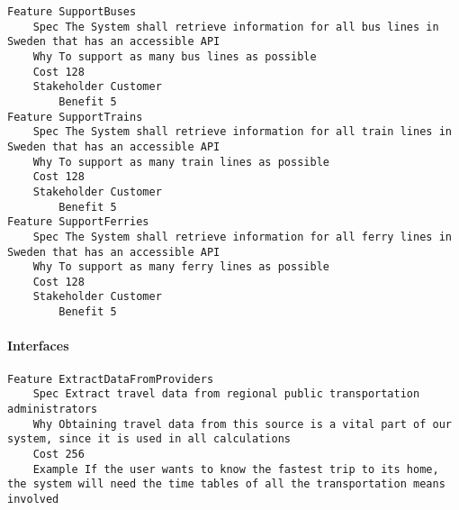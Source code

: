 \begin{lstlisting}
Feature SupportBuses
	Spec The System shall retrieve information for all bus lines in Sweden that has an accessible API
	Why To support as many bus lines as possible
	Cost 128
	Stakeholder Customer
		Benefit 5
Feature SupportTrains
	Spec The System shall retrieve information for all train lines in Sweden that has an accessible API
	Why To support as many train lines as possible
	Cost 128
	Stakeholder Customer
		Benefit 5
Feature SupportFerries
	Spec The System shall retrieve information for all ferry lines in Sweden that has an accessible API
	Why To support as many ferry lines as possible
	Cost 128
	Stakeholder Customer
		Benefit 5

\end{lstlisting}
		
				
			 \paragraph{Interfaces}


\begin{lstlisting}
Feature ExtractDataFromProviders
	Spec Extract travel data from regional public transportation administrators
	Why Obtaining travel data from this source is a vital part of our system, since it is used in all calculations
	Cost 256
	Example If the user wants to know the fastest trip to its home, the system will need the time tables of all the transportation means involved

\end{lstlisting}